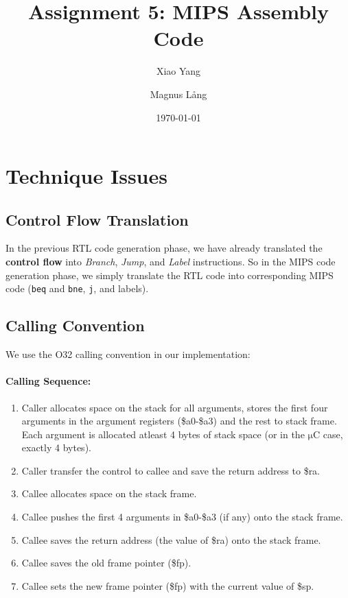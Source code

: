 \documentclass[a4paper,11pt]{article}
\title{Assignment 5: MIPS Assembly Code}
\author{Xiao Yang \and Magnus L{\aa}ng}
\date{\today}
\newcommand{\uC}{{$\mathrm{\mu}$}C }
\begin{document}
\maketitle

\section{Technique Issues}
\subsection{Control Flow Translation}
In the previous RTL code generation phase, we have already translated the
\textbf{control flow} into \textit{Branch}, \textit{Jump}, and \textit{Label}
instructions. So in the MIPS code generation phase, we simply translate the RTL
code into corresponding MIPS code (\texttt{beq} and \texttt{bne}, \texttt{j}, and labels).

\subsection{Calling Convention}
We use the O32 calling convention in our implementation:
	\paragraph{Calling Sequence:}
	\begin{enumerate}
		\item Caller allocates space on the stack for all arguments, stores the first four arguments in the argument registers (\$a0-\$a3) and the rest to stack frame.
          Each argument is allocated atleast 4 bytes of stack space (or in the
          \uC case, exactly 4 bytes).
		\item Caller transfer the control to callee and save the return address to \$ra.
		\item Callee allocates space on the stack frame.
		\item Callee pushes the first 4 arguments in \$a0-\$a3 (if any) onto the stack frame.
		\item Callee saves the return address (the value of \$ra) onto the stack frame.
		\item Callee saves the old frame pointer (\$fp).
		\item Callee sets the new frame pointer (\$fp) with the current value of \$sp.
	\end{enumerate}
\end{document}
